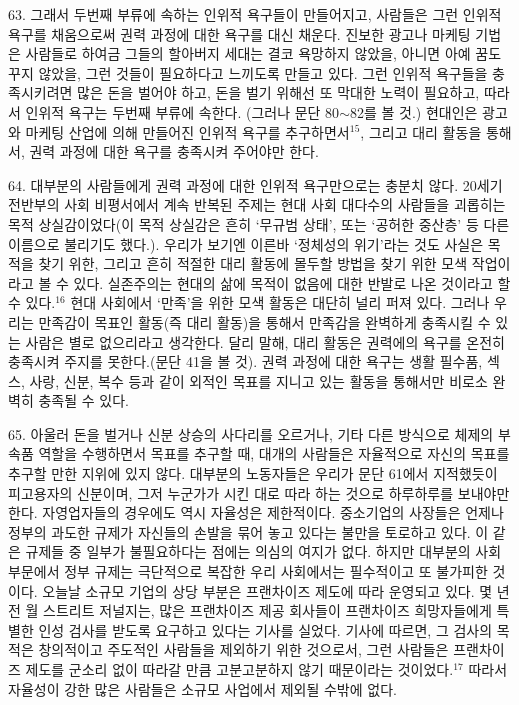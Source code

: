 \documentclass[11pt,a4paper]{article}
\begin{document}
\begin{multicols}{2}
63. 그래서 두번째 부류에 속하는 인위적 욕구들이 만들어지고, 사람들은 그런 인위적 욕구를 채움으로써 권력 과정에 대한 욕구를 대신 채운다. 진보한 광고나 마케팅 기법은 사람들로 하여금 그들의 할아버지  세대는 결코 욕망하지 않았을, 아니면 아예 꿈도 꾸지 않았을, 그런 것들이 필요하다고 느끼도록 만들고  있다. 그런 인위적 욕구들을 충족시키려면 많은 돈을 벌어야 하고, 돈을 벌기 위해선 또 막대한 노력이  필요하고, 따라서 인위적 욕구는 두번째 부류에 속한다. (그러나 문단 80${\sim}$82를 볼 것.) 현대인은 광고와  마케팅 산업에 의해 만들어진 인위적 욕구를 추구하면서\hyperlink{15}{$^{15}$}, 그리고 대리 활동을 통해서, 권력 과정에 대한  욕구를 충족시켜 주어야만 한다.


64. 대부분의 사람들에게 권력 과정에 대한 인위적 욕구만으로는 충분치 않다. 20세기 전반부의 사회  비평서에서 계속 반복된 주제는 현대 사회 대다수의 사람들을 괴롭히는 목적 상실감이었다(이 목적  상실감은 흔히 `무규범 상태', 또는 `공허한 중산층' 등 다른 이름으로 불리기도 했다.). 우리가 보기엔 이른바 `정체성의 위기'라는 것도 사실은 목적을 찾기 위한, 그리고 흔히 적절한 대리 활동에 몰두할  방법을 찾기 위한 모색 작업이라고 볼 수 있다. 실존주의는 현대의 삶에 목적이 없음에 대한 반발로 나온 것이라고 할 수 있다.\hyperlink{16}{$^{16}$} 현대 사회에서 `만족'을 위한 모색 활동은 대단히 널리 퍼져 있다. 그러나 우리는  만족감이 목표인 활동(즉 대리 활동)을 통해서 만족감을 완벽하게 충족시킬 수 있는 사람은 별로  없으리라고 생각한다. 달리 말해, 대리 활동은 권력에의 욕구를 온전히 충족시켜 주지를 못한다.(문단 41을 볼 것). 권력 과정에 대한 욕구는 생활 필수품, 섹스, 사랑, 신분, 복수 등과 같이 외적인 목표를 지니고  있는 활동을 통해서만 비로소 완벽히 충족될 수 있다. 


65. 아울러 돈을 벌거나 신분 상승의 사다리를 오르거나, 기타 다른 방식으로 체제의 부속품 역할을  수행하면서 목표를 추구할 때, 대개의 사람들은 자율적으로 자신의 목표를 추구할 만한 지위에 있지 않다. 대부분의 노동자들은 우리가 문단 61에서 지적했듯이 피고용자의 신분이며, 그저 누군가가 시킨 대로  따라 하는 것으로 하루하루를 보내야만 한다. 자영업자들의 경우에도 역시 자율성은 제한적이다.  중소기업의 사장들은 언제나 정부의 과도한 규제가 자신들의 손발을 묶어 놓고 있다는 불만을 토로하고  있다. 이 같은 규제들 중 일부가 불필요하다는 점에는 의심의 여지가 없다. 하지만 대부분의 사회  부문에서 정부 규제는 극단적으로 복잡한 우리 사회에서는 필수적이고 또 불가피한 것이다. 오늘날  소규모 기업의 상당 부분은 프랜차이즈 제도에 따라 운영되고 있다. 몇 년 전 \textlangle{}월 스트리트 저널\textrangle{}지는,  많은 프랜차이즈 제공 회사들이 프랜차이즈 희망자들에게 특별한 인성 검사를 받도록 요구하고 있다는  기사를 실었다. 기사에 따르면, 그 검사의 목적은 창의적이고 주도적인 사람들을 제외하기 위한 것으로서, 그런 사람들은 프랜차이즈 제도를 군소리 없이 따라갈 만큼 고분고분하지 않기 때문이라는 것이었다.\hyperlink{17}{$^{17}$} 따라서 자율성이 강한 많은 사람들은 소규모 사업에서 제외될 수밖에 없다.



\end{multicols}
\end{document}
